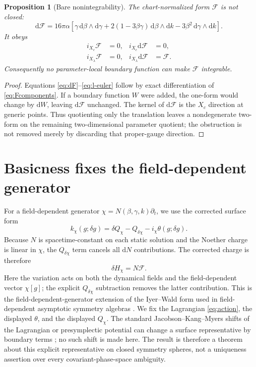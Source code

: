 \documentclass[11pt]{article}
\newtheorem{proposition}[theorem]{Proposition}
\theoremstyle{definition}
\theoremstyle{remark}
\newcommand{\dd}{\mathrm d}
\begin{document}
\begin{proposition}[Bare nonintegrability]
\label{prop:bare}
The chart-normalized form \(\mathcal F\) is not closed:
\begin{equation}\label{eq:dF}
 \dd\mathcal F=16\pi\alpha\left[
 \gamma\,\dd\beta\wedge\dd\gamma
 +2(1-3\beta\gamma)\,\dd\beta\wedge\dd k
 -3\beta^2\,\dd\gamma\wedge\dd k\right].
\end{equation}
It obeys
\begin{align}
 i_{X_c}\mathcal F&=0,&i_{X_c}\dd\mathcal F&=0,\label{eq:c-horizontal}\\
 i_{X_\lambda}\mathcal F&=0,&
 i_{X_\lambda}\dd\mathcal F&=\mathcal F.\label{eq:l-euler}
\end{align}
Consequently no parameter-local boundary function can make
\(\mathcal F\) integrable.
\end{proposition}

\begin{proof}
Equations \eqref{eq:dF}--\eqref{eq:l-euler} follow by exact
differentiation of \eqref{eq:Fcomponents}.  If a boundary function \(W\)
were added, the one-form would change by \(\dd W\), leaving
\(\dd\mathcal F\) unchanged.  The kernel of \(\dd\mathcal F\) is the
\(X_c\) direction at generic points.  Thus quotienting only the
translation leaves a nondegenerate two-form on the remaining
two-dimensional parameter quotient; the obstruction is not removed merely
by discarding that proper-gauge direction.
\end{proof}

\section{Basicness fixes the field-dependent generator}

For a field-dependent generator \(\chi=N(\beta,\gamma,k)\partial_t\), we
use the corrected surface form
\begin{equation}\label{eq:fdcharge}
 k_\chi(g;\delta g)
 =\delta Q_\chi-Q_{\delta\chi}-i_\chi\theta(g;\delta g).
\end{equation}
Because \(N\) is spacetime-constant on each static solution and the Noether
charge is linear in \(\chi\), the \(Q_{\delta\chi}\) term cancels all
\(\dd N\) contributions.  The corrected charge is therefore
\begin{equation}
 \delta H_\chi=N\mathcal F.
\end{equation}
Here the variation acts on both the dynamical fields and the
field-dependent vector \(\chi[g]\); the explicit \(Q_{\delta\chi}\)
subtraction removes the latter contribution.  This is the
field-dependent-generator extension of the Iyer--Wald form used in
field-dependent asymptotic symmetry algebras
\cite{BarnichTroessaert,WaldZoupas}.  We fix the Lagrangian
\eqref{eq:action}, the displayed \(\theta\), and the displayed \(Q_\chi\).
The standard Jacobson--Kang--Myers shifts of the Lagrangian or
presymplectic potential can change a surface representative by boundary
terms \cite{JacobsonKangMyers}; no such shift is made here.  The result is
therefore a theorem about this explicit representative on closed symmetry
spheres, not a uniqueness assertion over every covariant-phase-space
ambiguity.
\end{document}
